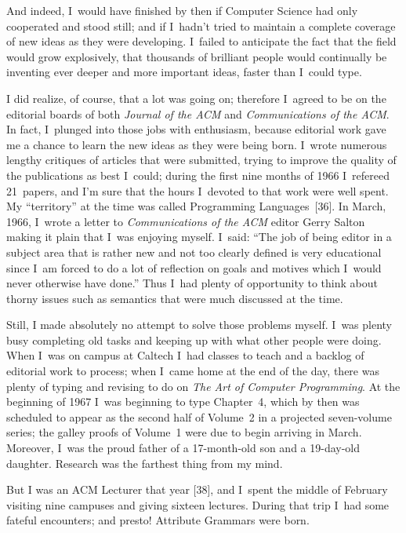 And indeed, I~would have finished by then if Computer Science had only
cooperated and stood still; and if I~hadn't tried to maintain a
complete coverage of new ideas as they were developing. I~failed to
anticipate the fact that the field would grow explosively, that
thousands of brilliant people would continually be inventing ever
deeper and more important ideas, faster than I~could type.

I did realize, of course, that a lot was going on; therefore I~agreed
to be on the editorial boards of both {\sl Journal of the ACM\/} and
{\sl Communications of the ACM}. In fact, I~plunged into those jobs
with enthusiasm, because editorial work gave me a chance to learn the
new ideas as they were being born. I~wrote numerous lengthy critiques
of articles that were submitted, trying to improve the quality of the
publications as best I~could; during the first nine months of 1966
I~refereed 21~papers, and I'm sure that 
the hours I~devoted to that work were well spent.
My ``territory'' at the time was called Programming Languages~[36].
In March, 1966, I~wrote a letter to {\sl Communications of the ACM\/}
editor Gerry Salton making it plain that I~was enjoying myself. 
I~said: ``The job of being editor in a subject area that is rather new
and not too clearly defined is very educational since I~am forced to
do a lot of reflection on goals and motives which I~would never
otherwise have done.'' Thus I~had plenty of opportunity to think about
thorny issues such as semantics that were much discussed at the time.

Still, I made absolutely no attempt to solve those problems myself.
I~was plenty busy completing old tasks and keeping up with what other
people were doing. When I~was on campus at Caltech I~had classes to
teach and a backlog of editorial work to process; when I~came home at
the end of the day, there was plenty of typing and revising to do on
{\sl The Art of Computer Programming}. At the beginning of 1967 I~was
beginning to type Chapter~4, which by then was scheduled to appear 
as the second half of
Volume~2 in a projected seven-volume series; the galley proofs of
Volume~1 were due to begin arriving in March. Moreover, I~was the
proud father of a 17-month-old son and a 19-day-old daughter. Research
was the farthest thing from my mind.

But I was an ACM Lecturer that year 
[38],
and I~spent the middle of February visiting nine campuses and giving
sixteen lectures. During that trip I~had some fateful encounters; and
presto! Attribute Grammars were born.

